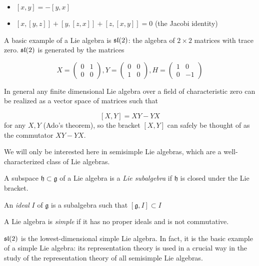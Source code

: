 \begin{itemize}
    \item $\left[ x,y \right] = -\left[ y,x \right]$
    \item $\left[ x, \left[ y,z \right] \right] + \left[ y, \left[ z,x \right] \right] + \left[ z, \left[ x,y \right] \right] = 0$ (the Jacobi identity)
\end{itemize}

A basic example of a Lie algebra is $\mathfrak{sl}(2)$: the algebra of $2 \times 2$
matrices with trace zero. $\mathfrak{sl}(2)$ is generated by the matrices 

\begin{equation}
    X = \begin{pmatrix} 0 & 1 \\ 0 & 0 \end{pmatrix},
    Y = \begin{pmatrix} 0 & 0 \\ 1 & 0 \end{pmatrix}, 
    H = \begin{pmatrix} 1 & 0 \\ 0 &-1 \end{pmatrix}
\end{equation}

In general any finite dimensional Lie algebra over a
field of characteristic zero can be realized as a vector space of matrices such
that 

\[ \left[ X,Y \right] = XY - YX\] 
for any $X,Y$ (Ado's theorem), so the bracket $[X,Y]$ can safely be thought of
as the commutator $XY - YX$. 


We will only be interested here in semisimple Lie algebras, which are a
well-characterized class of Lie algebras. 

\begin{defn}
    A subspace $\mathfrak{h} \subset \mathfrak{g}$ of a Lie algebra is a
    \emph{Lie subalgebra} if $\mathfrak{h}$ is closed under the Lie bracket. 

    An \emph{ideal} $I$ of $\mathfrak{g}$ is a subalgebra such that
    $[\mathfrak{g}, I] \subset I$
\end{defn}

\begin{defn}
    A Lie algebra is \emph{simple} if it has no proper ideals and is not
    commutative. 
\end{defn}

$\mathfrak{sl}(2)$ is the lowest-dimensional simple Lie algebra. In fact, it is the
basic example of a simple Lie algebra: its representation theory is used in a
crucial way in the study of the representation theory of all semisimple Lie
algebras.


